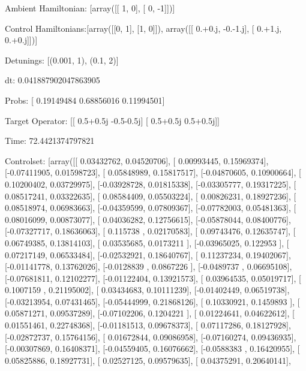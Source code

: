 \documentclass{article}
\begin{document}
    

\newpage

Ambient Hamiltonian: [array([[ 1,  0],
       [ 0, -1]])]

Control Hamiltonians:[array([[0, 1],
       [1, 0]]), array([[ 0.+0.j, -0.-1.j],
       [ 0.+1.j,  0.+0.j]])]

Detunings: [(0.001, 1), (0.1, 2)]

 dt: 0.041887902047863905

Probs: [ 0.19149484  0.68856016  0.11994501]

Target Operator: [[ 0.5+0.5j -0.5-0.5j]
 [ 0.5+0.5j  0.5+0.5j]]

Time: 72.4421374797821

Controlset: [array([[ 0.03432762,  0.04520706],
       [ 0.00993445,  0.15969374],
       [-0.07411905,  0.01598723],
       [ 0.05848989,  0.15817517],
       [-0.04870605,  0.10900664],
       [ 0.10200402,  0.03729975],
       [-0.03928728,  0.01815338],
       [-0.03305777,  0.19317225],
       [ 0.08517241,  0.03322635],
       [ 0.08584409,  0.05503224],
       [ 0.00826231,  0.18927236],
       [ 0.08518974,  0.06983663],
       [-0.04359599,  0.07809367],
       [-0.07782003,  0.05481363],
       [ 0.08016099,  0.00873077],
       [ 0.04036282,  0.12756615],
       [-0.05878044,  0.08400776],
       [-0.07327717,  0.18636063],
       [ 0.115738  ,  0.02170583],
       [ 0.09743476,  0.12635747],
       [ 0.06749385,  0.13814103],
       [ 0.03535685,  0.0173211 ],
       [-0.03965025,  0.122953  ],
       [ 0.07217149,  0.06533484],
       [-0.02532921,  0.18640767],
       [ 0.11237234,  0.19402067],
       [-0.01141778,  0.13762026],
       [-0.0128839 ,  0.0867226 ],
       [-0.0489737 ,  0.06695108],
       [-0.07681811,  0.12102277],
       [-0.01122404,  0.13921573],
       [ 0.03964535,  0.05019717],
       [ 0.1007159 ,  0.21195002],
       [ 0.03434683,  0.10111239],
       [-0.01402449,  0.06519738],
       [-0.03213954,  0.07431465],
       [-0.05444999,  0.21868126],
       [ 0.10330921,  0.1459893 ],
       [ 0.05871271,  0.09537289],
       [-0.07102206,  0.1204221 ],
       [ 0.01224641,  0.04622612],
       [ 0.01551461,  0.22748368],
       [-0.01181513,  0.09678373],
       [ 0.07117286,  0.18127928],
       [-0.02872737,  0.15764156],
       [ 0.01672844,  0.09086958],
       [-0.07160274,  0.09436935],
       [-0.00307869,  0.16408371],
       [-0.04559405,  0.16076662],
       [-0.0588383 ,  0.16420955],
       [ 0.05825886,  0.18927731],
       [ 0.02527125,  0.09579635],
       [ 0.04375291,  0.20640141],
\end{document}
